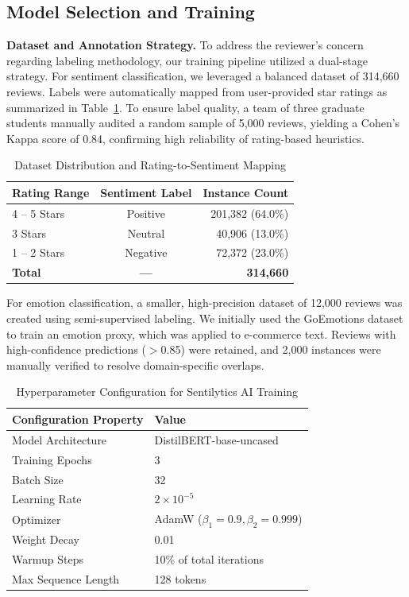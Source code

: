 \documentclass[11pt,a4paper]{article}
\begin{document}
\subsection{Model Selection and Training}

\textbf{Dataset and Annotation Strategy.} To address the reviewer's concern regarding labeling methodology, our training pipeline utilized a dual-stage strategy. For sentiment classification, we leveraged a balanced dataset of 314,660 reviews. Labels were automatically mapped from user-provided star ratings as summarized in Table~\ref{tab:distribution}. To ensure label quality, a team of three graduate students manually audited a random sample of 5,000 reviews, yielding a Cohen's Kappa score of 0.84, confirming high reliability of rating-based heuristics.

\begin{table}[H]
\centering
\caption{Dataset Distribution and Rating-to-Sentiment Mapping}
\label{tab:distribution}
\begin{tabular}{|l|c|r|}
\hline
\textbf{Rating Range} & \textbf{Sentiment Label} & \textbf{Instance Count} \\
\hline
4 -- 5 Stars & Positive & 201,382 (64.0\%) \\
3 Stars & Neutral & 40,906 (13.0\%) \\
1 -- 2 Stars & Negative & 72,372 (23.0\%) \\
\hline
\textbf{Total} & \textbf{---} & \textbf{314,660} \\
\hline
\end{tabular}
\end{table}

For emotion classification, a smaller, high-precision dataset of 12,000 reviews was created using semi-supervised labeling. We initially used the GoEmotions dataset to train an emotion proxy, which was applied to e-commerce text. Reviews with high-confidence predictions ($>$0.85) were retained, and 2,000 instances were manually verified to resolve domain-specific overlaps.

\begin{table}[H]
\centering
\caption{Hyperparameter Configuration for Sentilytics AI Training}
\label{tab:hyperparams}
\begin{tabular}{|l|l|}
\hline
\textbf{Configuration Property} & \textbf{Value} \\
\hline
Model Architecture & DistilBERT-base-uncased \\
Training Epochs & 3 \\
Batch Size & 32 \\
Learning Rate & $2 \times 10^{-5}$ \\
Optimizer & AdamW ($\beta_1=0.9, \beta_2=0.999$) \\
Weight Decay & 0.01 \\
Warmup Steps & 10\% of total iterations \\
Max Sequence Length & 128 tokens \\
\hline
\end{tabular}
\end{table}
\end{document}
